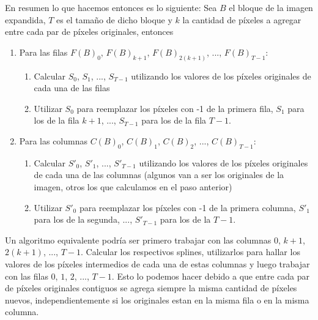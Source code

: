 \documentclass[a4paper]{article}
\newcounter{row}
\newcounter{col}
\newcommand\setrowauxx[4]{
	\setcounter{col}{1}
	\foreach \n in {#1, #2, #3, #4} {
	\edef\x{\value{col} - 0.5}
	\edef\y{4.5 - \value{row}}
	\node[anchor=center] at (\x, \y) {\n};
	\stepcounter{col}
	}
	\stepcounter{row}
}
\begin{document}
\begin{figure}[H]
{	
}
\caption{}
\label{bloqueImagen}
\end{figure}

\noindent En resumen lo que hacemos entonces es lo siguiente:
\newline Sea $B$ el bloque de la imagen expandida, $T$ es el tamaño de dicho bloque y $k$ la cantidad de píxeles a agregar entre cada par de píxeles originales, entonces
\begin{enumerate}
\item Para las filas $F(B)_0$, $F(B)_{k + 1}$, $F(B)_{2(k + 1)}$, ..., $F(B)_{T - 1}$:
\begin{enumerate}
\item Calcular $S_0$, $S_1$, ..., $S_{T - 1}$ utilizando los valores de los píxeles originales de cada una de las filas
\item Utilizar $S_0$ para reemplazar los píxeles con -1 de la primera fila, $S_1$ para los de la fila $k + 1$, ..., $S_{T - 1}$ para los de la fila $T - 1$.
\end{enumerate}
\item Para las columnas $C(B)_0$, $C(B)_1$, $C(B)_2$, ..., $C(B)_{T - 1}$:
\begin{enumerate}
\item Calcular $S'_0$, $S'_1$, ..., $S'_{T - 1}$ utilizando los valores de los píxeles originales de cada una de las columnas (algunos van a ser los originales de la imagen, otros los que calculamos en el paso anterior)
\item Utilizar $S'_0$ para reemplazar los píxeles con -1 de la primera columna, $S'_1$ para los de la segunda, ..., $S'_{T - 1}$ para los de la $T - 1$.
\end{enumerate}
\end{enumerate}

Un algoritmo equivalente podría ser primero trabajar con las columnas $0$, $k + 1$, $2(k + 1)$, ..., $T - 1$. Calcular los respectivos splines, utilizarlos para hallar los valores de los píxeles intermedios de cada una de estas columnas y luego trabajar con las filas $0$, $1$, $2$, ..., $T - 1$. Esto lo podemos hacer debido a que entre cada par de píxeles originales contiguos se agrega siempre la misma cantidad de píxeles nuevos, independientemente si los originales estan en la misma fila o en la misma columna.
\end{document}
